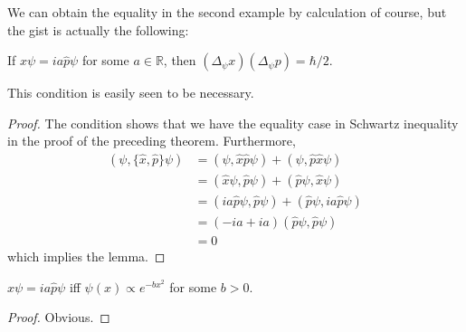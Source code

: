 We can obtain the equality in the second example by calculation of course, but the gist is actually the following:
\begin{lemma}
    If $\hat{x}\psi=ia\hat{p}\psi$ for some $a\in\mathbb R$, then $(\Delta_\psi x)(\Delta_\psi p)=\hbar/2$.
\end{lemma}
This condition is easily seen to be necessary.
\begin{proof}
    The condition shows that we have the equality case in Schwartz inequality in the proof of the preceding theorem.
    Furthermore,
    \begin{align*}
        (\psi,\{\hat{x},\hat{p}\}\psi)&=(\psi,\hat{x}\hat{p}\psi)+(\psi,\hat{p}\hat{x}\psi)\\
        &=(\hat{x}\psi,\hat{p}\psi)+(\hat{p}\psi,\hat{x}\psi)\\
        &=(ia\hat{p}\psi,\hat{p}\psi)+(\hat{p}\psi,ia\hat{p}\psi)\\
        &=(-ia+ia)(\hat{p}\psi,\hat{p}\psi)\\
        &=0
    \end{align*}
    which implies the lemma.
\end{proof}
\begin{lemma}
    $\hat{x}\psi=ia\hat{p}\psi$ iff $\psi(x)\propto e^{-bx^2}$ for some $b>0$.
\end{lemma}
\begin{proof}
    Obvious.
\end{proof}
